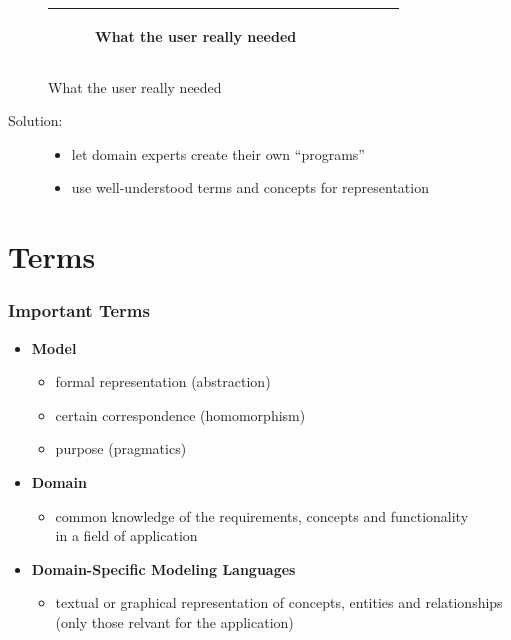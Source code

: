 \documentclass[11 pt,t]{beamer}
\begin{document}
\begin{frame}
\begin{figure}[h]
\begin{center}
{\begin{tabular}{|c|c|c|c|c|}
\begin{subfigure}[t]{0.15\textwidth}
\caption*{\tiny \centering What the user really needed}\label{fig:whatneeded}\end{subfigure}\\
\hline
\end{tabular}}
\label{fig:swingexample}
\end{center}
\end{figure}

\begin{description}
  \item [Solution:] 
  \begin{itemize}
     \item let domain experts create their own ``programs''
     \item use well-understood terms and concepts for representation
    \end{itemize}
\end{description}
\end{frame}

\section{Terms}
\begin{frame}
\vspace{.5cm}
  \frametitle{Important Terms}
  \begin{itemize}
    \item \textbf{Model}
      \begin{itemize}
       \item formal representation (abstraction)
       \item certain correspondence (homomorphism)
       \item purpose (pragmatics)
      \end{itemize}
      
    \item \textbf{Domain}
      \begin{itemize}
       \item common knowledge of the requirements, concepts and functionality 
	    \\in a field of application
      \end{itemize}

    \item \textbf{Domain-Specific Modeling Languages}
    \begin{itemize}
       \item textual or graphical representation of concepts, entities and relationships
	      (only those relvant for the application)
      \end{itemize}

  \end{itemize}
\end{frame}
\end{document}
